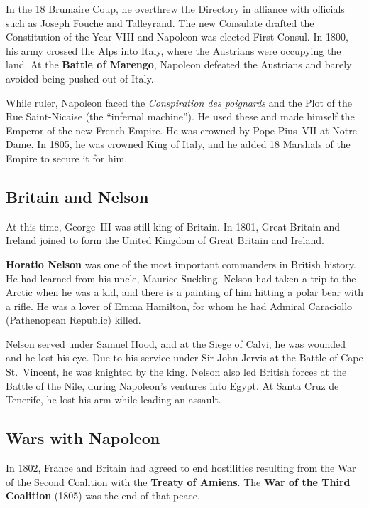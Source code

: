 In the 18 Brumaire Coup,
he overthrew the Directory in alliance with officials such as Joseph Fouche and Talleyrand.
The new Consulate drafted the Constitution of the Year VIII and Napoleon was elected First Consul.
In 1800, his army crossed the Alps into Italy, where the Austrians were occupying the land.
At the \textbf{Battle of Marengo},
Napoleon defeated the Austrians and barely avoided being pushed out of Italy.

While ruler, Napoleon faced the \textit{Conspiration des poignards}
and the Plot of the Rue Saint-Nicaise (the ``infernal machine'').
He used these and made himself the Emperor of the new French Empire.
He was crowned by Pope Pius~VII at Notre Dame.
In 1805, he was crowned King of Italy, and he added 18 Marshals of the Empire to secure it for him.

\subsection*{Britain and Nelson}

At this time, George~III was still king of Britain.
In 1801, Great Britain and Ireland joined to form the United Kingdom of Great Britain and Ireland.

\textbf{Horatio Nelson} was one of the most important commanders in British history.
He had learned from his uncle, Maurice Suckling.
Nelson had taken a trip to the Arctic when he was a kid,
and there is a painting of him hitting a polar bear with a rifle.
He was a lover of Emma Hamilton, for whom he had Admiral Caraciollo (Pathenopean Republic) killed.

Nelson served under Samuel Hood, and at the Siege of Calvi, he was wounded and he lost his eye.
Due to his service under Sir John Jervis at the Battle of Cape St.\ Vincent, he was knighted by the king.
Nelson also led British forces at the Battle of the Nile, during Napoleon's ventures into Egypt.
At Santa Cruz de Tenerife, he lost his arm while leading an assault.

\subsection*{Wars with Napoleon}

In 1802, France and Britain had agreed to end hostilities resulting from the War of the Second Coalition
with the \textbf{Treaty of Amiens}.
The \textbf{War of the Third Coalition} (1805) was the end of that peace.


